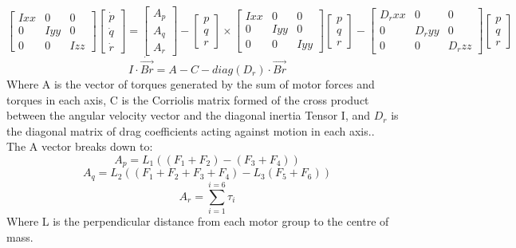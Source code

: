 \documentclass[12pt,a4paper,twoside]{report}
\begin{document}
				\begin{equation}
					\begin{bmatrix}
						Ixx & 0 & 0 \\
						0 & Iyy & 0 \\
						0 & 0 & Izz
					\end{bmatrix} 
					\begin{bmatrix}
						\dot{p} \\
						\dot{q} \\
						\dot{r}
					\end{bmatrix}
					=
					\begin{bmatrix}
						A_p \\
						A_q \\
						A_r
					\end{bmatrix}
					-
					\begin{bmatrix}
						p \\
						q \\
						r 
					\end{bmatrix}
					\times
					\begin{bmatrix}
						Ixx & 0 & 0 \\
						0 & Iyy & 0 \\
						0 & 0 & Iyy
					\end{bmatrix}
					\begin{bmatrix}
						p \\
						q \\
						r 
					\end{bmatrix}
					-
					\begin{bmatrix}
						D_rxx & 0 & 0 \\
						0 & D_ryy & 0 \\
						0 & 0 & D_rzz
					\end{bmatrix}
					\begin{bmatrix}
						p \\
						q \\
						r
					\end{bmatrix}
				\end{equation} 
				\[ I \cdot \dot{\vec{Br}} = A - C -  diag(D_r) \cdot \vec{Br}  \]
				Where A is the vector of torques generated by the sum of motor forces and torques in each axis, C is the Corriolis matrix formed of the cross product between the angular velocity vector and the diagonal inertia Tensor I, and \(D_r\) is the diagonal matrix of drag coefficients acting against motion in each axis.. 
				\\
				The A vector breaks down to:
				\begin{equation}
				 	A_p = L_1 ((F_1+F_2) - (F_3+F_4))
				\end{equation}
				\begin{equation}
				 	A_q = L_2 ((F_1+F_2+F_3+F_4) - L_3 (F_5+F_6)) 
				\end{equation}
				\begin{equation}
					 A_r = \sum_{i = 1}^{i = 6}\tau_i 
				\end{equation}
				Where L is the perpendicular distance from each motor group to the centre of mass.
					
\end{document}
